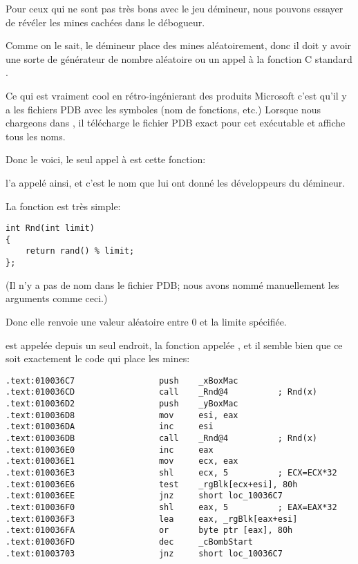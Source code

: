 \mysection{\MinesweeperWinXPExampleChapterName}
\label{minesweeper_winxp}

Pour ceux qui ne sont pas très bons avec le jeu démineur, nous pouvons essayer de
révéler les mines cachées dans le débogueur.


Comme on le sait, le démineur place des mines aléatoirement, donc il doit y avoir
une sorte de générateur de nombre aléatoire ou un appel à la fonction C standard
.

Ce qui est vraiment cool en rétro-ingénierant des produits Microsoft c'est qu'il
y a les fichiers \gls{PDB} avec les symboles (nom de fonctions, etc.)
Lorsque nous chargeons  dans \IDA, il télécharge le fichier \gls{PDB}
exact pour cet exécutable et affiche tous les noms.

Donc le voici, le seul appel à  est cette fonction:



\IDA l'a appelé ainsi, et c'est le nom que lui ont donné les développeurs du démineur.

La fonction est très simple:

\begin{lstlisting}[style=customc]
int Rnd(int limit)
{
    return rand() % limit;
};
\end{lstlisting}

(Il n'y a pas de nom  dans le fichier \gls{PDB}; nous avons nommé manuellement
les arguments comme ceci.)

Donc elle renvoie une valeur aléatoire entre 0 et la limite spécifiée.

 est appelée depuis un seul endroit, la fonction appelée ,
et il semble bien que ce soit exactement le code qui place les mines:

\begin{lstlisting}[style=customasmx86]
.text:010036C7                 push    _xBoxMac
.text:010036CD                 call    _Rnd@4          ; Rnd(x)
.text:010036D2                 push    _yBoxMac
.text:010036D8                 mov     esi, eax
.text:010036DA                 inc     esi
.text:010036DB                 call    _Rnd@4          ; Rnd(x)
.text:010036E0                 inc     eax
.text:010036E1                 mov     ecx, eax
.text:010036E3                 shl     ecx, 5          ; ECX=ECX*32
.text:010036E6                 test    _rgBlk[ecx+esi], 80h
.text:010036EE                 jnz     short loc_10036C7
.text:010036F0                 shl     eax, 5          ; EAX=EAX*32
.text:010036F3                 lea     eax, _rgBlk[eax+esi]
.text:010036FA                 or      byte ptr [eax], 80h
.text:010036FD                 dec     _cBombStart
.text:01003703                 jnz     short loc_10036C7
\end{lstlisting}

